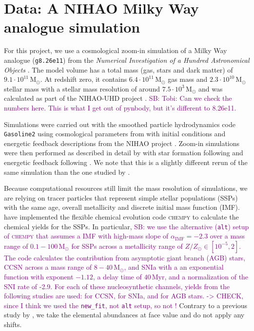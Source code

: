 \documentclass[fleqn,usenatbib]{mnras}
\newcommand{\SB}[1]{{\textcolor{purple}{SB: #1}}}
\begin{document}
\section{Data: A NIHAO Milky Way analogue simulation} \label{sec:data}

For this project, we use a cosmological zoom-in simulation of a Milky Way analogue (\texttt{g8.26e11}) from the \textit{Numerical Investigation of a Hundred Astronomical Objects} \citep[NIHAO,][]{Wang2015}. The model volume has a total mass (gas, stars and dark matter) of $9.1 \cdot 10^{11}\,\mathrm{M_\odot}$. At redshift zero, it contains $6.4 \cdot 10^{11}\,\mathrm{M_\odot}$ gas mass and $2.3 \cdot 10^{10}\,\mathrm{M_\odot}$ stellar mass with a stellar mass resolution of around $7.5 \cdot 10^{3}\,\mathrm{M_\odot}$ and was calculated as part of the NIHAO-UHD project \citep{Buck2020b}. \SB{Tobi: Can we check the numbers here. This is what I get out of pynbody, but it's different to 8.26e11.}

Simulations were carried out with the smoothed particle hydrodynamics code \texttt{Gasoline2} \citep{Wadsley2017} using cosmological parameters from \citet{Planck2014} with initial conditions and energetic feedback descriptions from the NIHAO project \citep{Wang2015}. Zoom-in simulations were then performed as described in detail by \citet{Buck2021} with star formation following \citet{Stinson2006} and energetic feedback following \citet{Stinson2013}. We note that this is a slightly different rerun of the same simulation than the one studied by \citet{Buder2024}.

Because computational resources still limit the mass resolution of simulations, we are relying on tracer particles that represent simple stellar populations (SSPs) with the same age, overall metallicity and discrete initial mass function (IMF). \citet{Buck2021} have implemented the flexible chemical evolution code \textsc{chempy} \citep{Rybizki2017} to calculate the chemical yields for the SSPs. In particular, \SB{we use the alternative (\texttt{alt}) setup of \textsc{chempy} that assumes a \citet{Chabrier2003} IMF with high-mass slope of $\alpha_\text{IMF} = -2.3$ over a mass range of $0.1-100\,\mathrm{M_\odot}$ for SSPs across a metallicity range of $Z/Z_\odot \in [10^{-5},2]$. The code calculates the contribution from asymptotic giant branch (AGB) stars, CCSN across a mass range of $8-40\,\mathrm{M_\odot}$, and SNIa with a an exponential function with exponent $-1.12$, a delay time of $40\,\mathrm{Myr}$, and a normalization of the SNI rate of -2.9. For each of these nucleosynthetic channels, yields from the following studies are used: \citet{Limongi2018} for CCSN, \citet{Seitenzahl2013} for SNIa, and \citet{Karakas2016} for AGB stars. -> CHECK, since I think we used the \texttt{new\_fit}, not \texttt{alt} setup, so \citet{Chieffi2004} not \citet{Limongi2018}!} Contrary to a previous study by \citet{Buder2024}, we take the elemental abundances at face value and do not apply any shifts.
\end{document}

